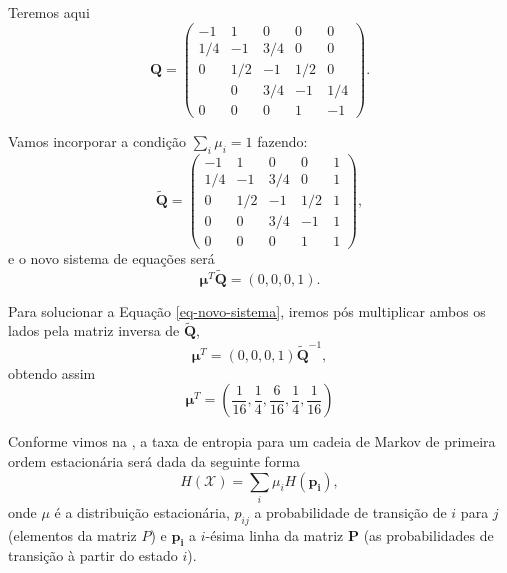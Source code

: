 \begin{example}
Teremos aqui
\begin{equation}
\mathbf{Q} = \begin{pmatrix}
-1  &  1  & 0   & 0   & 0   \\
1/4 & -1  & 3/4 & 0   & 0   \\
0   & 1/2 & -1  & 1/2 & 0   \\
   & 0   & 3/4 & -1  & 1/4 \\
0   & 0   & 0   & 1   & -1
\end{pmatrix} .
\end{equation}

Vamos incorporar a condição $\sum_i \mu_i = 1$ fazendo:
\begin{equation}
\tilde{\mathbf{Q}} = \begin{pmatrix}
-1  &  1  & 0   & 0   & 1 \\
1/4 & -1  & 3/4 & 0   & 1 \\
0   & 1/2 & -1  & 1/2 & 1 \\
0   & 0   & 3/4 & -1  & 1 \\
0   & 0   & 0   & 1   & 1
\end{pmatrix} ,
\end{equation}
e o novo sistema de equações será
\begin{equation}\label{eq-novo-sistema}
\mathbf{\mu}^T \tilde{\mathbf{Q}} = (0, 0, 0, 1) .
\end{equation}

Para solucionar a Equação \ref{eq-novo-sistema}, iremos pós multiplicar ambos os lados
pela matriz inversa de $\tilde{\mathbf{Q}}$,
\begin{equation}
\mathbf{\mu}^T = (0, 0, 0, 1) \tilde{\mathbf{Q}}^{-1} ,
\end{equation}
obtendo assim
\begin{equation}
\mathbf{\mu}^T = \left( \frac{1}{16}, \frac{1}{4}, \frac{6}{16}, \frac{1}{4}, \frac{1}{16} \right)
\end{equation}

Conforme vimos na , a taxa de entropia para um
cadeia de Markov de primeira ordem estacionária será dada da seguinte forma
\begin{equation}
  H(\mathcal{X}) = \sum_i \mu_i H( \mathbf{p_i} ) ,
\end{equation}
onde $\mu$ é a distribuição estacionária,
$p_{ij}$ a probabilidade de transição de $i$ para $j$ (elementos da matriz $P$)
e $\mathbf{p_i}$ a $i$-ésima linha da matriz $\mathbf{P}$ (as probabilidades de transição à partir
do estado $i$).


\end{example}
